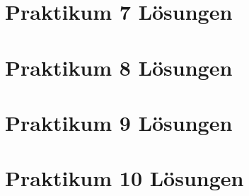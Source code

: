 \documentclass{scrartcl}
\newcommand{\basepath}{praktika/}
\begin{document}


\section{Praktikum 7 Lösungen}







\section{Praktikum 8 Lösungen}




\section{Praktikum 9 Lösungen}



















\section{Praktikum 10 Lösungen}







\end{document}
